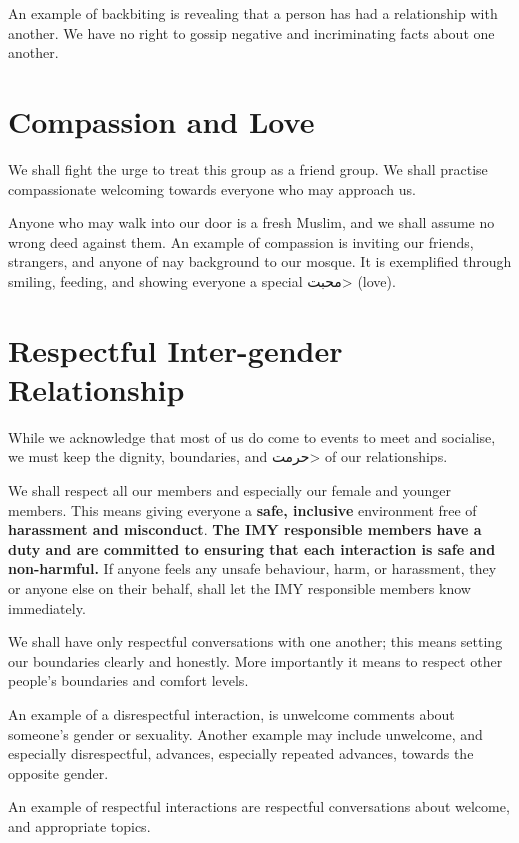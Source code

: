 \documentclass{article}
\begin{document}
An example of backbiting is revealing that a person has had a relationship with another.
We have no right to gossip negative and incriminating facts about one another.

\section{Compassion and Love}
We shall fight the urge to treat this group as a friend group.
We shall practise compassionate welcoming towards everyone who may approach us.

Anyone who may walk into our door is a fresh Muslim, and we shall assume no wrong deed against them.
An example of compassion is inviting our friends, strangers, and anyone of nay background to our mosque.
It is exemplified through smiling, feeding, and showing everyone a special \<محبت> (love).

\section{Respectful Inter-gender Relationship}
While we acknowledge that most of us do come to events to meet and socialise, we must keep the dignity, boundaries, and \<حرمت> of our relationships.

We shall respect all our members and especially our female and younger members.
This means giving everyone a \textbf{safe, inclusive} environment free of \textbf{harassment and misconduct}.
\textbf{The IMY responsible members have a duty and are committed to ensuring that each interaction is safe and non-harmful. }
If anyone feels any unsafe behaviour, harm, or harassment, they or anyone else on their behalf, shall let the IMY responsible members know immediately.

We shall have only respectful conversations with one another; this means setting our boundaries clearly and honestly.
More importantly it means to respect other people's boundaries and comfort levels.

An example of a disrespectful interaction, is unwelcome comments about someone's gender or sexuality.
Another example may include unwelcome, and especially disrespectful, advances, especially repeated advances, towards the opposite gender.

An example of respectful interactions are respectful conversations about welcome, and appropriate topics.
\end{document}
